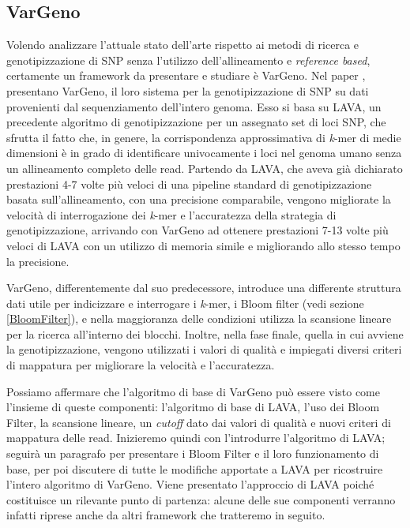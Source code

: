 \documentclass[../main.tex]{subfiles}
\begin{document}
\subsection{VarGeno}
\label{vargeno}
Volendo analizzare l'attuale stato dell'arte rispetto ai metodi di ricerca e genotipizzazione di SNP senza l'utilizzo dell'allineamento e \textit{reference based}, certamente un framework da presentare e studiare è VarGeno. Nel paper \cite{sun-medvedev2018vargeno}, presentano VarGeno, il loro sistema per la genotipizzazione di SNP su dati provenienti dal sequenziamento dell'intero genoma. Esso si basa su LAVA\cite{shajii2016lava}, un precedente algoritmo di genotipizzazione per un assegnato set di loci SNP, che sfrutta il fatto che, in genere, la corrispondenza approssimativa di \textit{k}-mer di medie dimensioni è in grado di identificare univocamente i loci nel genoma umano senza un allineamento completo delle read. \textcolor{BurntOrange}{Partendo da LAVA, che aveva già dichiarato prestazioni 4-7 volte più veloci di una pipeline standard di genotipizzazione basata sull'allineamento, con una precisione comparabile, vengono migliorate la velocità di interrogazione dei \textit{k}-mer e l'accuratezza della strategia di genotipizzazione, arrivando con VarGeno ad ottenere prestazioni 7-13 volte più veloci di LAVA con un utilizzo di memoria simile e migliorando allo stesso tempo la precisione.}

VarGeno, differentemente dal suo predecessore, introduce una differente struttura dati utile per indicizzare e interrogare i \textit{k}-mer, i Bloom filter (vedi sezione \ref{BloomFilter}), e nella maggioranza delle condizioni utilizza la scansione lineare per la ricerca all'interno dei blocchi. Inoltre, nella fase finale, quella in cui avviene la genotipizzazione, vengono utilizzati i valori di qualità e impiegati diversi criteri di mappatura per migliorare la velocità e l'accuratezza. 

Possiamo affermare che l'algoritmo di base di VarGeno può essere visto come l'insieme di queste componenti: l'algoritmo di base di LAVA, l'uso dei Bloom Filter, la scansione lineare, un \textit{cutoff} dato dai valori di qualità e nuovi criteri di mappatura delle read. Inizieremo quindi con l'introdurre l'algoritmo di LAVA; seguirà un paragrafo per presentare i Bloom Filter e il loro funzionamento di base, per poi discutere di tutte le modifiche apportate a LAVA per ricostruire l'intero algoritmo di VarGeno. Viene presentato l'approccio di LAVA poiché costituisce un rilevante punto di partenza: alcune delle sue componenti verranno infatti riprese anche da altri framework che tratteremo in seguito.
\end{document}
